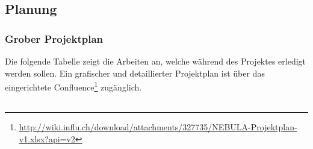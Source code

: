 \newpage
\subsection{Planung} 
\subsubsection{Grober Projektplan}
Die folgende Tabelle zeigt die Arbeiten an, welche während des Projektes erledigt werden sollen. Ein grafischer und detaillierter Projektplan ist über das eingerichtete Confluence\footnote{\url{http://wiki.influ.ch/download/attachments/327735/NEBULA-Projektplan-v1.xlsx?api=v2}} zugänglich.

\begin{table}[H]
\centering
\begin{tabular}{|p{0.7cm}p{6.8cm}p{2cm}p{2cm}|c|c|c|}


\end{tabular}
\end{table}
